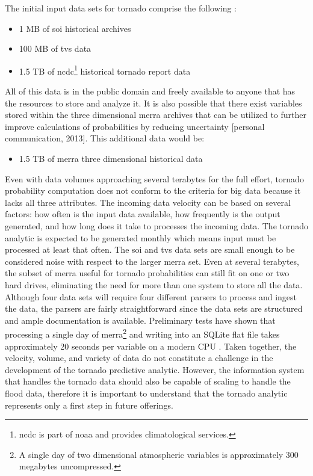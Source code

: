 The initial input data sets for tornado comprise the following \cite{walker}:
\begin{itemize}
    \item 1 MB of \gls{soi} historical archives \cite{bom}
    \item 100 MB of \gls{tvs} data \cite{hdss}
    \item 1.5 TB of \gls{ncdc}\footnote{\gls{ncdc} is part of \gls{noaa} and provides climatological services.} historical tornado report data\cite{ncdc}
\end{itemize}
All of this data is in the public domain and freely available to anyone that has the resources to store and analyze it. It is also possible that there exist variables stored within the three dimensional \gls{merra} archives that can be utilized to further improve calculations of probabilities by reducing uncertainty [personal communication, 2013]. This additional data would be:
\begin{itemize}
    \item 1.5 TB of \gls{merra} three dimensional historical data \cite{mdisc}
\end{itemize}
Even with data volumes approaching several terabytes for the full effort, tornado probability computation does not conform to the criteria for big data because it lacks all three attributes. The incoming data velocity can be based on several factors: how often is the input data available, how frequently is the output generated, and how long does it take to processes the incoming data. The tornado analytic is expected to be generated monthly which means input must be processed at least that often. The \gls{soi} and \gls{tvs} data sets are small enough to be considered noise with respect to the larger \gls{merra} set. Even at several terabytes, the subset of \gls{merra} useful for tornado probabilities can still fit on one or two hard drives, eliminating the need for more than one system to store all the data.  Although four data sets will require four different parsers to process and ingest the data, the parsers are fairly straightforward since the data sets are structured and ample documentation is available. Preliminary tests have shown that processing a single day of \gls{merra}\footnote{A single day of two dimensional atmospheric variables is approximately 300 megabytes uncompressed.} and writing into an SQLite flat file takes approximately 20 seconds per variable on a modern CPU \cite{keller1}. Taken together, the velocity, volume, and variety of data do not constitute a challenge in the development of the tornado predictive analytic. However, the information system that handles the tornado data should also be capable of scaling to handle the flood data, therefore it is important to understand that the tornado analytic represents only a first step in future offerings.\\

